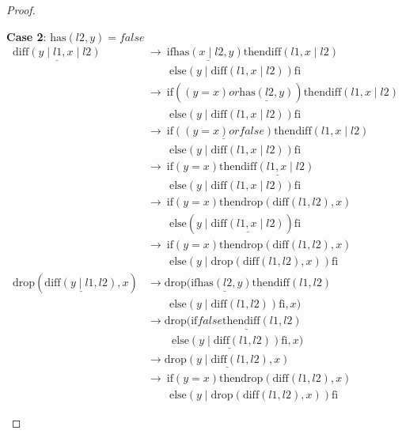\documentclass[12pt, a4paper]{article}
\newcommand{\rel}[1]{\mathrel{#1}}
\newcommand{\rmx}[1]{\mathrm{#1}}
\newcommand{\larrow}{\longrightarrow}
\newcommand{\under}{\underline}
\begin{document}
\begin{proof}
\begin{description}
\textbf{Case 2}: $\rmx{has}(l2, y) = false$
\begin{align*}
\under{\rmx{diff}(y \mid l1, x \mid l2)}
	&\larrow\ \rel{\rmx{if}} \under{\rmx{has}(x \mid l2, y)} \rel{\rmx{then}} \rmx{diff}(l1, x \mid l2) \\
	&\quad \quad \rel{\rmx{else}} (y \mid \rmx{diff}(l1, x \mid l2)) \rel{\rmx{fi}} \tag{by diff2} \\
	&\larrow\ \rel{\rmx{if}} ((y = x) \rel{or} \under{\rmx{has}(l2, y)}) \rel{\rmx{then}} \rmx{diff}(l1, x \mid l2) \\
	&\quad \quad \rel{\rmx{else}} (y \mid \rmx{diff}(l1, x \mid l2)) \rel{\rmx{fi}} \tag{by has2} \\
	&\larrow\ \rel{\rmx{if}} \under{((y = x) \rel{or} false)} \rel{\rmx{then}} \rmx{diff}(l1, x \mid l2) \\
	&\quad \quad \rel{\rmx{else}} (y \mid \rmx{diff}(l1, x \mid l2)) \rel{\rmx{fi}} \tag{by case splitting} \\
	&\larrow\ \rel{\rmx{if}} (y = x) \rel{\rmx{then}} \under{\rmx{diff}(l1, x \mid l2)} \\
	&\quad \quad \rel{\rmx{else}} (y \mid \rmx{diff}(l1, x \mid l2)) \rel{\rmx{fi}} \tag{by or} \\
	&\larrow\ \rel{\rmx{if}} (y = x) \rel{\rmx{then}} \rmx{drop}(\rmx{diff}(l1, l2), x) \\
	&\quad \quad \rel{\rmx{else}} (y \mid \under{\rmx{diff}(l1, x \mid l2)}) \rel{\rmx{fi}} \tag{by IH} \\
	&\larrow\ \rel{\rmx{if}} (y = x) \rel{\rmx{then}} \rmx{drop}(\rmx{diff}(l1, l2), x) \\
	&\quad \quad \rel{\rmx{else}} (y \mid \rmx{drop}(\rmx{diff}(l1, l2), x)) \rel{\rmx{fi}} \tag{by IH} \\
\rmx{drop}(\under{\rmx{diff}(y \mid l1, l2)}, x)
	&\larrow \rmx{drop}(\rel{\rmx{if}} \under{\rmx{has}(l2, y)} \rel{\rmx{then}} \rmx{diff}(l1, l2) \\
	&\quad \quad \rel{\rmx{else}} (y \mid \rmx{diff}(l1, l2)) \rel{\rmx{fi}}, x) \tag{by diff2} \\
	&\larrow \rmx{drop}(\under{\rel{\rmx{if}} false \rel{\rmx{then}} \rmx{diff}(l1, l2)} \\
	&\quad \quad\ \under{\rel{\rmx{else}} (y \mid \rmx{diff}(l1, l2)) \rel{\rmx{fi}}}, x) \tag{by case splitting} \\
	&\larrow \under{\rmx{drop}(y \mid \rmx{diff}(l1, l2), x)} \tag{by if2} \\
	&\larrow\ \rel{\rmx{if}} (y = x) \rel{\rmx{then}} \rmx{drop}(\rmx{diff}(l1, l2), x) \\
	&\quad \quad \rel{\rmx{else}} (y \mid \rmx{drop}(\rmx{diff}(l1, l2), x)) \rel{\rmx{fi}} \tag{by drop2}
\end{align*}
\end{description}

\end{proof}
\end{document}
